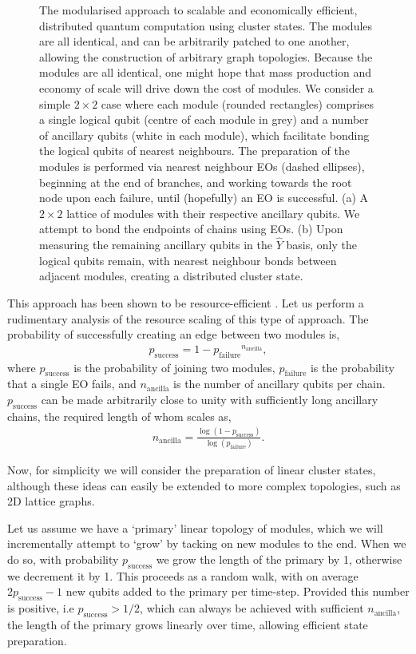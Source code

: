 \begin{figure}[htpb]
\caption{The modularised approach to scalable and economically efficient, distributed quantum computation using cluster states. The modules are all identical, and can be arbitrarily patched to one another, allowing the construction of arbitrary graph topologies. Because the modules are all identical, one might hope that mass production and economy of scale will drive down the cost of modules. We consider a simple \mbox{$2\times 2$} case where each module (rounded rectangles) comprises a single logical qubit (centre of each module in grey) and a number of ancillary qubits (white in each module), which facilitate bonding the logical qubits of nearest neighbours. The preparation of the modules is performed via nearest neighbour EOs (dashed ellipses), beginning at the end of branches, and working towards the root node upon each failure, until (hopefully) an EO is successful. (a) A \mbox{$2\times 2$} lattice of modules with their respective ancillary qubits. We attempt to bond the endpoints of chains using EOs. (b) Upon measuring the remaining ancillary qubits in the $\hat{Y}$ basis, only the logical qubits remain, with nearest neighbour bonds between adjacent modules, creating a distributed cluster state.} \label{fig:module}
\end{figure}

This approach has been shown to be resource-efficient \cite{bib:YoranReznik03, bib:Nielsen04}. Let us perform a rudimentary analysis of the resource scaling of this type of approach. The probability of successfully creating an edge between two modules is,
\begin{align}
p_\mathrm{success} = 1 - {p_\mathrm{failure}}^{n_\mathrm{ancilla}},
\end{align}
where $p_\mathrm{success}$ is the probability of joining two modules, $p_\mathrm{failure}$ is the probability that a single EO fails, and $n_\mathrm{ancilla}$ is the number of ancillary qubits per chain. $p_\mathrm{success}$ can be made arbitrarily close to unity with sufficiently long ancillary chains, the required length of whom scales as,
\begin{align}
n_\mathrm{ancilla} = \frac{\log (1-p_\mathrm{success})}{\log (p_\mathrm{failure})}.
\end{align}

Now, for simplicity we will consider the preparation of linear cluster states, although these ideas can easily be extended to more complex topologies, such as 2D lattice graphs.

Let us assume we have a `primary' linear topology of modules, which we will incrementally attempt to `grow' by tacking on new modules to the end. When we do so, with probability $p_\mathrm{success}$ we grow the length of the primary by 1, otherwise we decrement it by 1. This proceeds as a random walk, with on average \mbox{$2p_\mathrm{success}-1$} new qubits added to the primary per time-step. Provided this number is positive, i.e \mbox{$p_\mathrm{success}>1/2$}, which can always be achieved with sufficient $n_\mathrm{ancilla}$, the length of the primary grows linearly over time, allowing efficient state preparation.

